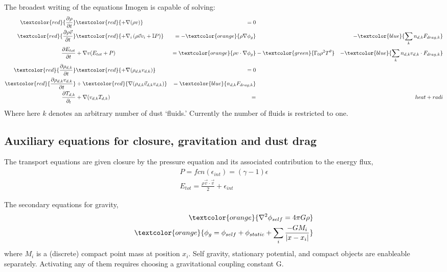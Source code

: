 \documentclass[letterpaper,12pt]{article}
\begin{document}
The broadest writing of the equations Imogen is capable of solving:
\begin{align*}
\textcolor{red}{\frac{\partial \rho}{\partial t}} & \textcolor{red}{ + \nabla (\rho v)} &= 0 & &  \\
\textcolor{red}{\frac{\partial \rho \vec{v}}{\partial t} } & \textcolor{red}{+ \nabla_i \left( \rho \vec{v} v_i + \mathbb{I} P \right)} &= 
- \textcolor{orange}{\rho \nabla \phi_g } & & - 
\textcolor{blue}{ \sum_k n_{d,k} F_{drag,k}  }\\
\frac{\partial E_{tot}}{\partial t} &+ \nabla v (E_{tot} + P) &= 
\textcolor{orange}{\rho v \cdot \nabla \phi_g} & 
- \textcolor{green}{\Gamma_0 \rho^2 T^\theta } &
- \textcolor{blue}{\sum_k n_{d,k} v_{d,k} \cdot F_{drag,k}} \\
\textcolor{red}{\frac{\partial \rho_{d,k}}{\partial t}} & \textcolor{red}{+ \nabla (\rho_{d,k} v_{d,k})} &= 0 & & \\
\textcolor{red}{\frac{\partial \rho_{d,k} v_{d,k}}{\partial t}} &+ \textcolor{red}{\nabla (\rho_{d,k} \vec{v}_{d,k} v_{d,k})}
&= \textcolor{blue}{n_{d,k} F_{drag,k}}  & & \\
\frac{\partial T_{d,k}}{\partial_t} &+ \nabla (v_{d,k} T_{d,k} ) &= & & heat+radi
\end{align*}
Where here $k$ denotes an arbitrary number of dust `fluids.' Currently the number of fluids is restricted to one.

\subsection{Auxiliary equations for closure, gravitation and dust drag}

The transport equations are given closure by the pressure equation and its associated contribution to the energy flux,
\begin{align*}
P = fcn(\epsilon_{int}) = (\gamma-1) \epsilon \\
E_{tot} = \frac{\rho \vec{v} \cdot \vec{v}}{2} + \epsilon_{int}
\end{align*}

The secondary equations for gravity,
\begin{align*}
\textcolor{orange}{\nabla^2 \phi_{self} = 4 \pi G \rho} \\
\textcolor{orange}{\phi_g = \phi_{self} + \phi_{static} + \sum_{i} \frac{-G M_i}{|x - x_i|} }
\end{align*}
where $M_i$ is a (discrete) compact point mass at position $x_i$.
Self gravity, stationary potential, and compact objects are enableable separately.
Activating any of them requires choosing a gravitational coupling constant G.
\end{document}
